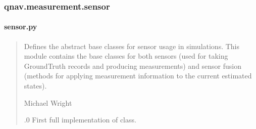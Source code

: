 \documentclass[letterpaper,10pt,english]{sphinxmanual}
\begin{document}
\sphinxstepscope


\subsubsection{qnav.measurement.sensor}
\label{\detokenize{modules/measurement/sensor:module-qnav.measurement.sensor}}\label{\detokenize{modules/measurement/sensor:qnav-measurement-sensor}}\label{\detokenize{modules/measurement/sensor::doc}}

\paragraph{sensor.py}
\label{\detokenize{modules/measurement/sensor:sensor-py}}\begin{quote}\begin{description}
\sphinxAtStartPar
Defines the abstract base classes for sensor usage in simulations.
This module contains the base classes for both sensors (used for taking
GroundTruth records and producing measurements) and sensor fusion (methods
for applying measurement information to the current estimated states).

\sphinxAtStartPar
Michael Wright \sphinxhyphen{} 

.0 \sphinxhyphen{} First full implementation of class.

\end{description}\end{quote}
\end{document}
